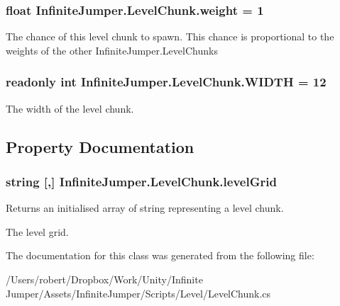 \hypertarget{class_infinite_jumper_1_1_level_chunk_ad0f0414835c2a34aeefe18df62527a55}{}
\subsubsection[{weight}]{\setlength{\rightskip}{0pt plus 5cm}float Infinite\+Jumper.\+Level\+Chunk.\+weight = 1}\label{class_infinite_jumper_1_1_level_chunk_ad0f0414835c2a34aeefe18df62527a55}


The chance of this level chunk to spawn. This chance is proportional to the weights of the other Infinite\+Jumper.\+Level\+Chunks 

\hypertarget{class_infinite_jumper_1_1_level_chunk_a1e0f9070a662c732f06e798b3e77b58e}{}
\subsubsection[{W\+I\+D\+T\+H}]{\setlength{\rightskip}{0pt plus 5cm}readonly int Infinite\+Jumper.\+Level\+Chunk.\+W\+I\+D\+T\+H = 12\hspace{0.3cm}{\ttfamily [static]}}\label{class_infinite_jumper_1_1_level_chunk_a1e0f9070a662c732f06e798b3e77b58e}


The width of the level chunk. 



\subsection{Property Documentation}
\hypertarget{class_infinite_jumper_1_1_level_chunk_a05f4bc058f1040c62635712d09f064c7}{}
\subsubsection[{level\+Grid}]{\setlength{\rightskip}{0pt plus 5cm}string \mbox{[},\mbox{]} Infinite\+Jumper.\+Level\+Chunk.\+level\+Grid\hspace{0.3cm}{\ttfamily [get]}}\label{class_infinite_jumper_1_1_level_chunk_a05f4bc058f1040c62635712d09f064c7}


Returns an initialised array of string representing a level chunk. 

The level grid.

The documentation for this class was generated from the following file\+:\begin{DoxyCompactItemize}
\item 
/\+Users/robert/\+Dropbox/\+Work/\+Unity/\+Infinite Jumper/\+Assets/\+Infinite\+Jumper/\+Scripts/\+Level/Level\+Chunk.\+cs\end{DoxyCompactItemize}
